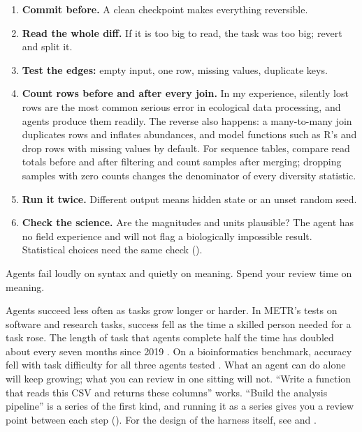 \begin{enumerate}
  \item \textbf{Commit before.} A clean checkpoint makes everything reversible.
  \item \textbf{Read the whole diff.} If it is too big to read, the task was too
    big; revert and split it.
  \item \textbf{Test the edges:} empty input, one row, missing values,
    duplicate keys.
  \item \textbf{Count rows before and after every join.} In my experience,
    silently lost rows are the most common serious error in ecological data
    processing, and agents produce them readily. The reverse also happens: a
    many-to-many join duplicates rows and inflates abundances, and model
    functions such as R's  and  drop rows with missing
    values by default. For sequence tables, compare read totals before and
    after filtering and count samples after merging; dropping samples with
    zero counts changes the denominator of every diversity statistic.
  \item \textbf{Run it twice.} Different output means hidden state or an unset
    random seed.
  \item \textbf{Check the science.} Are the magnitudes and units plausible? The
    agent has no field experience and will not flag a biologically impossible
    result. Statistical choices need the same check ().
\end{enumerate}

\begin{keypoint}
Agents fail loudly on syntax and quietly on meaning. Spend your review time on
meaning.
\end{keypoint}

Agents succeed less often as tasks grow longer or harder. In METR's tests on
software and research tasks, success fell as the time a skilled person needed
for a task rose. The length of task that agents complete half the time has
doubled about every seven months since 2019 \parencite{kwa2025horizon}. On a
bioinformatics benchmark, accuracy fell with task difficulty for all three
agents tested \parencite{guo2026promptbio}. What an agent can do alone will
keep growing; what you can review in one sitting will not. ``Write a function
that reads this CSV and returns these columns'' works. ``Build the analysis
pipeline'' is a series of the first kind, and running it as a series gives
you a review point between each step (). For
the design of the harness itself, see \textcite{liu2026claudecode} and
\textcite{piskala2026files}.

